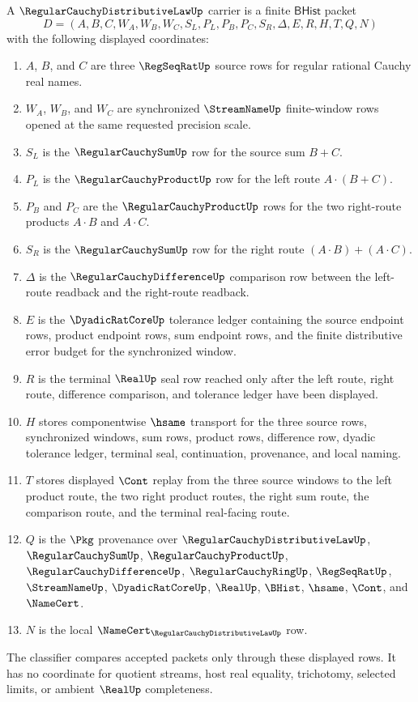 \begin{definition}
\label{def:regular-cauchy-distributive-law-carrier}
A $\RegularCauchyDistributiveLawUp$ carrier is a finite $\mathsf{BHist}$ packet
$$
D=(A,B,C,W_A,W_B,W_C,S_L,P_L,P_B,P_C,S_R,\Delta,E,R,H,T,Q,N)
$$
with the following displayed coordinates:
\begin{enumerate}
\item $A$, $B$, and $C$ are three $\RegSeqRatUp$ source rows for regular rational Cauchy real names.
\item $W_A$, $W_B$, and $W_C$ are synchronized $\StreamNameUp$ finite-window rows opened at the same requested precision scale.
\item $S_L$ is the $\RegularCauchySumUp$ row for the source sum $B+C$.
\item $P_L$ is the $\RegularCauchyProductUp$ row for the left route $A\cdot(B+C)$.
\item $P_B$ and $P_C$ are the $\RegularCauchyProductUp$ rows for the two right-route products $A\cdot B$ and $A\cdot C$.
\item $S_R$ is the $\RegularCauchySumUp$ row for the right route $(A\cdot B)+(A\cdot C)$.
\item $\Delta$ is the $\RegularCauchyDifferenceUp$ comparison row between the left-route readback and the right-route readback.
\item $E$ is the $\DyadicRatCoreUp$ tolerance ledger containing the source endpoint rows, product endpoint rows, sum endpoint rows, and the finite distributive error budget for the synchronized window.
\item $R$ is the terminal $\RealUp$ seal row reached only after the left route, right route, difference comparison, and tolerance ledger have been displayed.
\item $H$ stores componentwise $\hsame$ transport for the three source rows, synchronized windows, sum rows, product rows, difference row, dyadic tolerance ledger, terminal seal, continuation, provenance, and local naming.
\item $T$ stores displayed $\Cont$ replay from the three source windows to the left product route, the two right product routes, the right sum route, the comparison route, and the terminal real-facing route.
\item $Q$ is the $\Pkg$ provenance over $\RegularCauchyDistributiveLawUp$, $\RegularCauchySumUp$, $\RegularCauchyProductUp$, $\RegularCauchyDifferenceUp$, $\RegularCauchyRingUp$, $\RegSeqRatUp$, $\StreamNameUp$, $\DyadicRatCoreUp$, $\RealUp$, $\BHist$, $\hsame$, $\Cont$, and $\NameCert$.
\item $N$ is the local $\NameCert_{\RegularCauchyDistributiveLawUp}$ row.
\end{enumerate}
The classifier compares accepted packets only through these displayed rows. It has no coordinate for quotient streams, host real equality, trichotomy, selected limits, or ambient $\RealUp$ completeness.
\end{definition}

